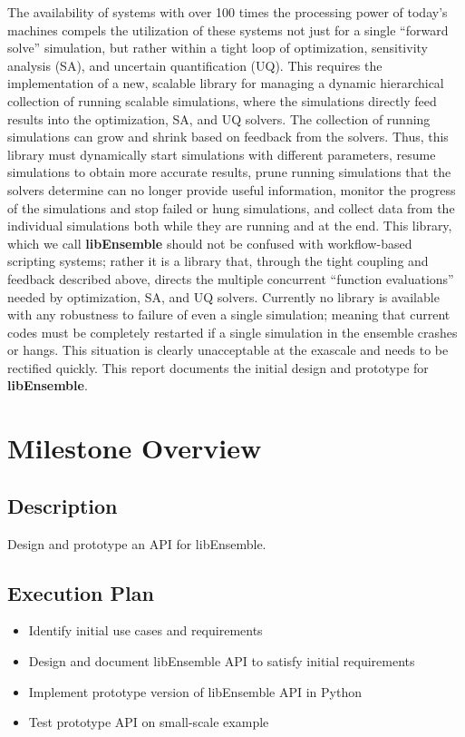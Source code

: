 \documentclass{ecpreport}
\begin{document}
The availability of systems with over 100 times the processing power of today’s 
machines compels the utilization of these systems not just for a single ``forward 
solve'' simulation, but rather within a tight loop of optimization, sensitivity 
analysis (SA), and uncertain quantification (UQ). This requires the implementation 
of a new, scalable library for managing a dynamic hierarchical collection of 
running scalable simulations, where the simulations directly feed results 
into the optimization, SA, and UQ solvers.  The collection of running simulations 
can grow and shrink based on feedback from the solvers. Thus, this library must 
dynamically start simulations with different parameters, resume simulations to 
obtain more accurate results, prune running simulations that the solvers determine 
can no longer provide useful information, monitor the progress of the simulations 
and stop failed or hung simulations, and collect data from the individual 
simulations both while they are running and at the end.  This library, which 
we call {\bf libEnsemble} should not be confused with workflow-based scripting 
systems; rather it is a library that, through the tight coupling and feedback 
described above, directs the multiple concurrent ``function evaluations'' 
needed by optimization, SA, and UQ solvers. Currently no library is available 
with any robustness to failure of even a single simulation; meaning that current
codes must be completely restarted if a single simulation in the ensemble 
crashes or hangs. This situation is clearly unacceptable at the exascale
and needs to be rectified quickly.  This report documents the initial
design and prototype for {\bf libEnsemble}.

\section{Milestone Overview}

\subsection{Description}

Design and prototype an API for libEnsemble.

\subsection{Execution Plan}

\begin{itemize}
\item Identify initial use cases and requirements
\item Design and document libEnsemble API to satisfy initial requirements
\item Implement prototype version of libEnsemble API in Python
\item Test prototype API on small-scale example
\end{itemize}
\end{document}
